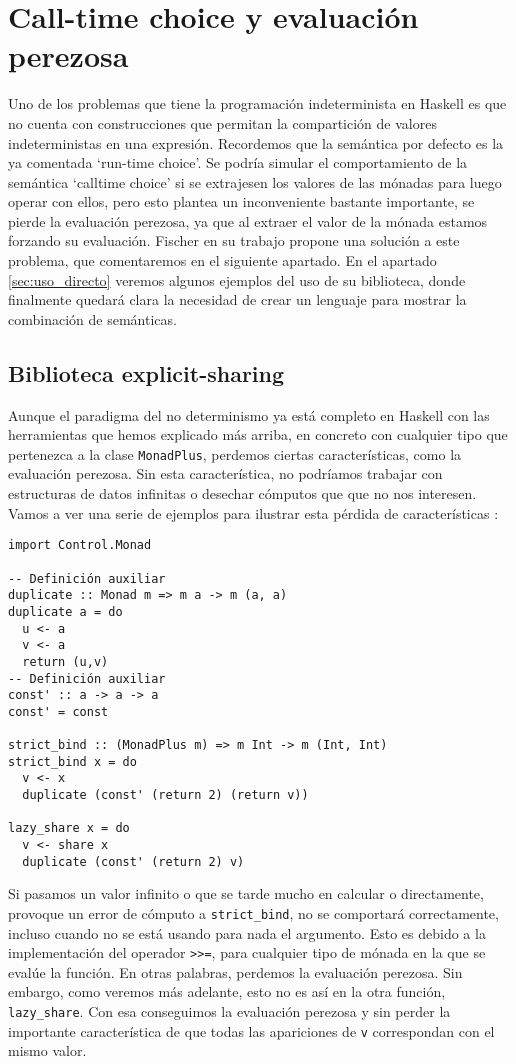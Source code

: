 \documentclass[class=article, crop=false]{standalone}
\begin{document}
\section{Call-time choice y evaluación perezosa}
Uno de los problemas que tiene la programación indeterminista en Haskell es que no cuenta con
construcciones que permitan la compartición de valores indeterministas en una expresión.
Recordemos que la semántica por defecto es la ya comentada `run-time choice'. Se podría
simular el comportamiento de la semántica `calltime choice' si se extrajesen los valores de
las mónadas para luego operar con ellos, pero esto plantea un inconveniente bastante
importante, se pierde la evaluación perezosa, ya que al extraer el valor de la mónada estamos
forzando su evaluación. Fischer en su trabajo propone una solución a este problema, que
comentaremos en el siguiente apartado. En el apartado \ref{sec:uso_directo} veremos algunos
ejemplos del uso de su biblioteca, donde finalmente quedará clara la necesidad de crear un
lenguaje para mostrar la combinación de semánticas.

\subsection{Biblioteca explicit-sharing}\label{sec:explicit_sharing}
Aunque el paradigma del no determinismo ya está completo en Haskell con las herramientas que
hemos explicado más arriba, en concreto con cualquier tipo que pertenezca a la clase
\verb`MonadPlus`, perdemos ciertas características, como la evaluación perezosa. Sin esta
característica, no podríamos trabajar con estructuras de datos infinitas o desechar cómputos
que que no nos interesen. Vamos a ver una serie de ejemplos para ilustrar esta pérdida de
características \cite{fischer2011purely}:

\begin{verbatim}
import Control.Monad

-- Definición auxiliar
duplicate :: Monad m => m a -> m (a, a)
duplicate a = do
  u <- a
  v <- a
  return (u,v)
-- Definición auxiliar
const' :: a -> a -> a
const' = const

strict_bind :: (MonadPlus m) => m Int -> m (Int, Int)
strict_bind x = do
  v <- x
  duplicate (const' (return 2) (return v))

lazy_share x = do
  v <- share x
  duplicate (const' (return 2) v)
\end{verbatim}

Si pasamos un valor infinito o que se tarde mucho en calcular o directamente, provoque un
error de cómputo a \verb`strict_bind`, no se comportará correctamente, incluso cuando no se
está usando para nada el argumento. Esto es debido a la implementación del operador
\verb`>>=`, para cualquier tipo de mónada en la que se evalúe la función. En otras palabras,
perdemos la evaluación perezosa. Sin embargo, como veremos más adelante, esto no es así en
la otra función, \verb`lazy_share`. Con esa conseguimos la evaluación perezosa y sin perder
la importante característica de que todas las apariciones de \verb`v` correspondan con el
mismo valor.
\newpage
\end{document}
